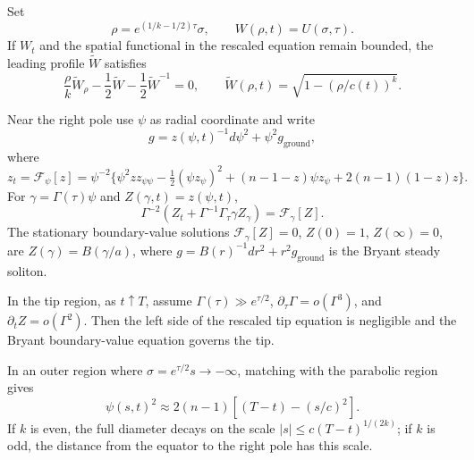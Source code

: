 \begin{definition}
\label{def:chow-iv-intermediate-profile}
Set
\[
 \rho=e^{(1/k-1/2)\tau}\sigma,\qquad W(\rho,t)=U(\sigma,\tau).
\]
If $W_t$ and the spatial functional in the rescaled equation remain bounded,
the leading profile $\widetilde W$ satisfies
\[
 \frac\rho k\widetilde W_\rho-\frac12\widetilde W-\frac12\widetilde W^{-1}=0,
 \qquad \widetilde W(\rho,t)=\sqrt{1-(\rho/c(t))^k}.
\]
\end{definition}

\begin{definition}
\label{def:chow-iv-tip-bryant-profile}
Near the right pole use $\psi$ as radial coordinate and write
\[
 g=z(\psi,t)^{-1}d\psi^2+\psi^2g_{\mathrm{ground}},
\]
where
\[
 z_t=\mathcal F_\psi[z]=\psi^{-2}\{\psi^2zz_{\psi\psi}
 -\tfrac12(\psi z_\psi)^2+(n-1-z)\psi z_\psi+2(n-1)(1-z)z\}.
\]
For $\gamma=\Gamma(\tau)\psi$ and $Z(\gamma,t)=z(\psi,t)$,
\[
 \Gamma^{-2}(Z_t+\Gamma^{-1}\Gamma_\tau\gamma Z_\gamma)=\mathcal F_\gamma[Z].
\]
The stationary boundary-value solutions $\mathcal F_\gamma[Z]=0$,
$Z(0)=1$, $Z(\infty)=0$, are
$Z(\gamma)=B(\gamma/a)$, where
$g=B(r)^{-1}dr^2+r^2g_{\mathrm{ground}}$ is the Bryant steady soliton.
\end{definition}

\begin{definition}
\label{def:chow-iv-tip-ansatz}
In the tip region, as $t\uparrow T$, assume
$\Gamma(\tau)\gg e^{\tau/2}$, $\partial_\tau\Gamma=o(\Gamma^3)$, and
$\partial_tZ=o(\Gamma^2)$.  Then the left side of the rescaled tip equation
is negligible and the Bryant boundary-value equation governs the tip.
\end{definition}

\begin{proposition}
\label{prop:chow-iv-outer-profile}
In an outer region where $\sigma=e^{\tau/2}s\to-\infty$, matching with the
parabolic region gives
\[
 \psi(s,t)^2\approx2(n-1)\left[(T-t)-(s/c)^2\right].
\]
If $k$ is even, the full diameter decays on the scale
$|s|\le c(T-t)^{1/(2k)}$; if $k$ is odd, the distance from the equator to the
right pole has this scale.
\end{proposition}

